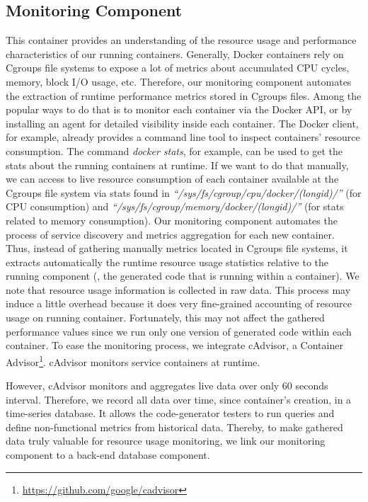 \subsection{Monitoring Component}
This container provides an understanding of the resource usage and performance characteristics of our running containers. Generally, Docker containers rely on Cgroups file systems to expose a lot of metrics about accumulated CPU cycles, memory, block I/O usage, etc. Therefore, our monitoring component automates the extraction of runtime performance metrics stored in Cgroups files. 
Among the popular ways to do that is to monitor each container via the Docker API, or by installing an agent for detailed visibility inside each container. 
The Docker client, for example, already provides a command line tool to inspect containers' resource consumption. The command \textit{docker stats}, for example, can be used to get the stats about the running containers at runtime. 
If we want to do that manually, we can access to live resource consumption of each container available at the Cgroups file system via stats found in \textit{``/sys/fs/cgroup/cpu/docker/(longid)/''} (for CPU consumption) and \textit{``/sys/fs/cgroup/memory/docker/(longid)/''} (for stats related to memory consumption). Our monitoring component automates the process of service discovery and metrics aggregation for each new container. Thus, instead of gathering manually metrics located in Cgroups file systems, it extracts automatically the runtime resource usage statistics relative to the running component (\ie, the generated code that is running within a container). We note that resource usage information is collected in raw data. This process may induce a little overhead because it does  very fine-grained accounting of resource usage on running container. Fortunately, this may not affect the gathered performance values since we run only one version of generated code within each container.
To ease the monitoring process, we integrate cAdvisor, a Container Advisor\footnote{\url{https://github.com/google/cadvisor}}. cAdvisor monitors service containers at runtime. 

However, cAdvisor monitors and aggregates live data over only 60 seconds interval. Therefore, we record all data over time, since container's creation, in a time-series database. It allows the code-generator testers to run queries and define non-functional metrics from historical data. Thereby, to make gathered data truly valuable for resource usage monitoring, we link our monitoring component to a back-end database component. 



